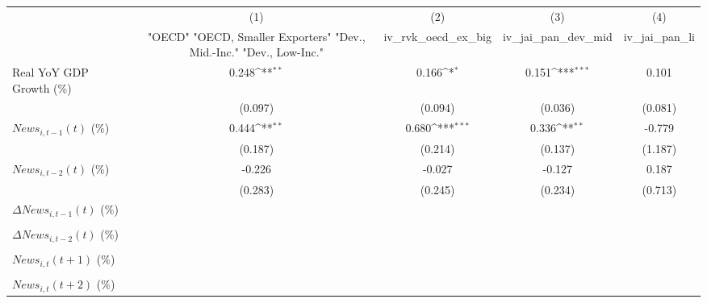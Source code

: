 {
\def\sym#1{\ifmmode^{#1}\else\(^{#1}\)\fi}
\begin{tabular}{l*{4}{c}}
\toprule
                    &\multicolumn{1}{c}{(1)}&\multicolumn{1}{c}{(2)}&\multicolumn{1}{c}{(3)}&\multicolumn{1}{c}{(4)}\\
                    &\multicolumn{1}{c}{ "OECD" "OECD, Smaller Exporters" "Dev., Mid.-Inc." "Dev., Low-Inc."}&\multicolumn{1}{c}{iv_rvk_oecd_ex_big}&\multicolumn{1}{c}{iv_jai_pan_dev_mid}&\multicolumn{1}{c}{iv_jai_pan_li}\\
\midrule
Real YoY GDP Growth (\%)&       0.248\sym{**} &       0.166\sym{*}  &       0.151\sym{***}&       0.101         \\
                    &     (0.097)         &     (0.094)         &     (0.036)         &     (0.081)         \\
\addlinespace
$ News_{i,t-1}(t)$ (\%)&       0.444\sym{**} &       0.680\sym{***}&       0.336\sym{**} &      -0.779         \\
                    &     (0.187)         &     (0.214)         &     (0.137)         &     (1.187)         \\
\addlinespace
$ News_{i,t-2}(t)$ (\%)&      -0.226         &      -0.027         &      -0.127         &       0.187         \\
                    &     (0.283)         &     (0.245)         &     (0.234)         &     (0.713)         \\
\addlinespace
$ \Delta News_{i,t-1}(t)$ (\%)&                     &                     &                     &                     \\
                    &                     &                     &                     &                     \\
\addlinespace
$ \Delta News_{i,t-2}(t)$ (\%)&                     &                     &                     &                     \\
                    &                     &                     &                     &                     \\
\addlinespace
$ News_{i,t}(t+1)$ (\%)&                     &                     &                     &                     \\
                    &                     &                     &                     &                     \\
\addlinespace
$ News_{i,t}(t+2)$ (\%)&                     &                     &                     &                     \\

\end{tabular}}

